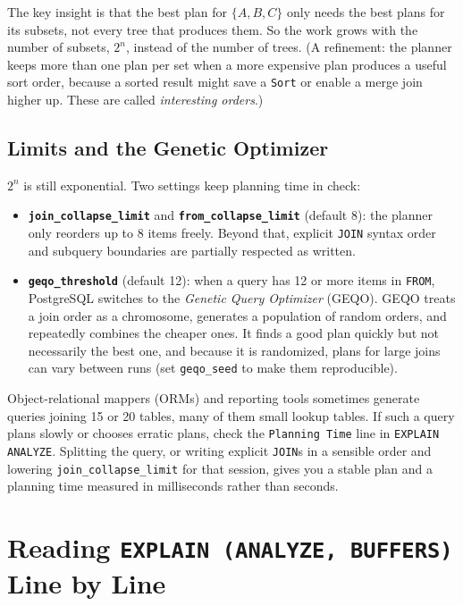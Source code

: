 The key insight is that the best plan for $\{A, B, C\}$ only needs the best plans for its subsets, not every tree that produces them. So the work grows with the number of subsets, $2^n$, instead of the number of trees. (A refinement: the planner keeps more than one plan per set when a more expensive plan produces a useful sort order, because a sorted result might save a \texttt{Sort} or enable a merge join higher up. These are called \emph{interesting orders}.)

\subsection{Limits and the Genetic Optimizer}

$2^n$ is still exponential. Two settings keep planning time in check:
\begin{itemize}
  \item \textbf{\texttt{join\_collapse\_limit}} and \textbf{\texttt{from\_collapse\_limit}} (default 8): the planner only reorders up to 8 items freely. Beyond that, explicit \texttt{JOIN} syntax order and subquery boundaries are partially respected as written.
  \item \textbf{\texttt{geqo\_threshold}} (default 12): when a query has 12 or more items in \texttt{FROM}, PostgreSQL switches to the \emph{Genetic Query Optimizer} (GEQO). GEQO treats a join order as a chromosome, generates a population of random orders, and repeatedly combines the cheaper ones. It finds a good plan quickly but not necessarily the best one, and because it is randomized, plans for large joins can vary between runs (set \texttt{geqo\_seed} to make them reproducible).
\end{itemize}

\begin{applicationbox}
Object-relational mappers (ORMs) and reporting tools sometimes generate queries joining 15 or 20 tables, many of them small lookup tables. If such a query plans slowly or chooses erratic plans, check the \texttt{Planning Time} line in \texttt{EXPLAIN ANALYZE}. Splitting the query, or writing explicit \texttt{JOIN}s in a sensible order and lowering \texttt{join\_collapse\_limit} for that session, gives you a stable plan and a planning time measured in milliseconds rather than seconds.
\end{applicationbox}

\section{Reading \texttt{EXPLAIN (ANALYZE, BUFFERS)} Line by Line}
\label{ch07:explain}

